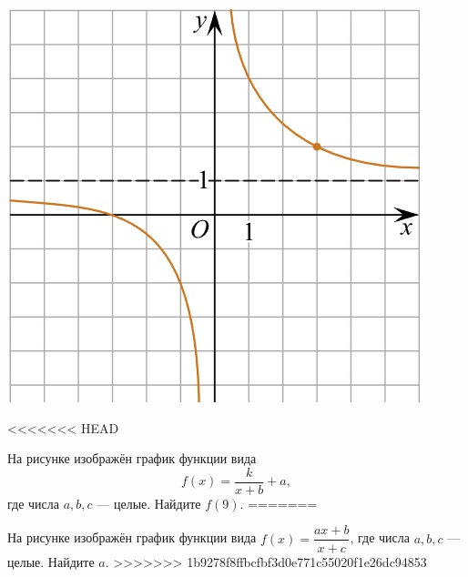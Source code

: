 \begin{class}[number=5]
\begin{listofex}
\begin{minipage}[t]{\bodywidth}
\begin{minipage}[t]{\bodywidth}
\begin{minipage}[t]{\picwidth}
			\includegraphics[align=t, width=\linewidth]{../pics/G101M4C5-1.jpg}
		\end{minipage}
		\item
<<<<<<< HEAD
		\begin{minipage}[t]{\bodywidth}
			На рисунке изображён график функции вида \[ f(x)=\dfrac{k}{x+b}+a, \] где числа \(a, b, c\) --- целые. Найдите \(f(9)\).
=======
		\begin{minipage}[t]{0.43\textwidth}
			На рисунке изображён график функции вида \(f(x)=\dfrac{ax+b}{x+c}\), где числа \(a, b, c\) --- целые. Найдите \(a\).
>>>>>>> 1b9278f8ffbcfbf3d0e771c55020f1e26dc94853
		\end{minipage}
		\hspace{0.05\linewidth}
		\begin{minipage}[t]{\picwidth}

\end{minipage}
\end{minipage}
\end{minipage}
\end{minipage}
\end{listofex}
\end{class}
